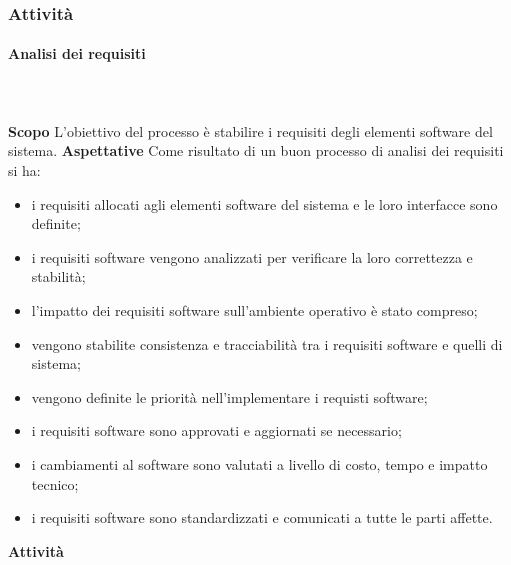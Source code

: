 	\subsubsection{Attività}
		\paragraph{Analisi dei requisiti} \mbox{}\\ \mbox{}\\
			\textbf{Scopo} \newline \newline
			L'obiettivo del processo è stabilire i requisiti degli elementi software del sistema.
			\newline \newline
			\textbf{Aspettative}\newline \newline
			Come risultato di un buon processo di analisi dei requisiti si ha:
			\begin{itemize}
			\item i requisiti allocati agli elementi software del sistema e le loro interfacce sono definite;
			\item i requisiti software vengono analizzati per verificare la loro correttezza e stabilità;
			\item l'impatto dei requisiti software sull'ambiente operativo è stato compreso;
			\item vengono stabilite consistenza e tracciabilità tra i requisiti software e quelli di sistema;
			\item vengono definite le priorità nell'implementare i requisti software;
			\item i requisiti software sono approvati e aggiornati se necessario;
			\item i cambiamenti al software sono valutati a livello di costo, tempo e impatto tecnico;
			\item i requisiti software sono standardizzati e comunicati a tutte le parti affette.
			\end{itemize} 
			\textbf{Attività}  \mbox{}\\ \mbox{}\\
